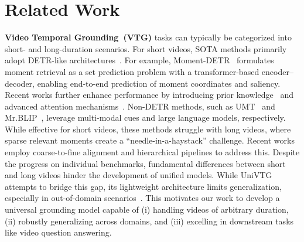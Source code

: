 \section{Related Work}
\label{sec:related}
\noindent \textbf{Video Temporal Grounding~(VTG)} 
tasks can typically be categorized into short- and long-duration scenarios. 
For short videos, SOTA methods primarily adopt DETR-like architectures~\cite{carion2020end,lei2021detecting,moon2023query,moon2023correlation,gordeev2024saliency}. 
For example, Moment-DETR~\cite{lei2021detecting} formulates moment retrieval as a set prediction problem with a transformer-based encoder–decoder, enabling end-to-end prediction of moment coordinates and saliency. Recent works further enhance performance by introducing prior knowledge~\cite{jang2023knowing} and advanced attention mechanisms~\cite{moon2023query,moon2023correlation}.
%
Non-DETR methods, such as UMT~\cite{liu2022umt} and Mr.BLIP~\cite{meinardus2024surprising}, leverage multi-modal cues and large language models, respectively. 
While effective for short videos, these methods struggle with long videos, where sparse relevant moments create a ``needle-in-a-haystack'' challenge. 
Recent works~\cite{hou2022cone,pan2023scanning} employ coarse-to-fine alignment and hierarchical pipelines to address this.
%
Despite the progress on individual benchmarks, fundamental differences between short and long videos hinder the development of unified models. 
While UniVTG~\cite{lin2023univtg} attempts to bridge this gap, its lightweight architecture limits generalization, especially in out-of-domain scenarios~\cite{shi2024aotd}.
This motivates our work to develop a universal grounding model capable of (i) handling videos of arbitrary duration, (ii) robustly generalizing across domains, and (iii) excelling in downstream tasks like video question answering.


